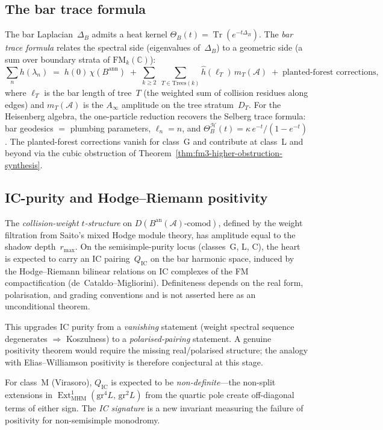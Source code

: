 \documentclass[11pt]{article}
\newcommand{\cA}{\mathcal{A}}
\newcommand{\cH}{\mathcal{H}}
\newcommand{\FM}{\mathrm{FM}}
\newcommand{\Ext}{\operatorname{Ext}}
\newcommand{\Tr}{\operatorname{Tr}}
\providecommand{\bC}{\mathbb{C}}
\begin{document}
\subsection{The bar trace formula}
\label{sec:bar-trace-formula}

The bar Laplacian~$\Delta_B$ admits a heat kernel
$\Theta_B(t) = \Tr(e^{-t\Delta_B})$.
The \emph{bar trace formula} relates the spectral side
(eigenvalues of~$\Delta_B$) to a geometric side (a sum
over boundary strata of $\FM_k(\bC)$):
\[
  \sum_n h(\lambda_n)
  \;=\;
  h(0)\,\chi(B^{\mathrm{ann}})
  \;+\;
  \sum_{k \geq 2}\;
  \sum_{T \in \mathrm{Trees}(k)}
  \hat{h}(\ell_T)\, m_T(\cA)
  \;+\;
  \text{planted-forest corrections},
\]
where $\ell_T$ is the bar length of tree~$T$ (the
weighted sum of collision residues along edges)
and $m_T(\cA)$ is the $A_\infty$ amplitude on the
tree stratum~$D_T$.  For the Heisenberg algebra,
the one-particle reduction recovers the Selberg trace
formula: bar geodesics $=$ plumbing parameters,
$\ell_n = n$, and
$\Theta_B^{\cH}(t) = \kappa\, e^{-t}/(1 - e^{-t})$.
The planted-forest corrections vanish for class~G
and contribute at class~L and beyond via the cubic
obstruction of Theorem~\ref{thm:fm3-higher-obstruction-synthesis}.

\subsection{IC-purity and Hodge--Riemann positivity}
\label{sec:ic-purity-positivity}

The \emph{collision-weight $t$-structure} on
$D(B^{\mathrm{an}}(\cA)\text{-comod})$, defined by the
weight filtration from Saito's mixed Hodge module theory,
has amplitude equal to the shadow depth~$r_{\max}$.  On the
semisimple-purity locus (classes~G, L, C), the heart is expected
to carry an IC pairing~$Q_{\mathrm{IC}}$ on the bar harmonic
space, induced by the Hodge--Riemann bilinear relations on IC
complexes of the FM compactification (de~Cataldo--Migliorini).
Definiteness depends on the real form, polarisation, and grading
conventions and is not asserted here as an unconditional theorem.

This upgrades IC purity from a \emph{vanishing} statement
(weight spectral sequence degenerates $\Rightarrow$
Koszulness) to a \emph{polarised-pairing} statement.  A genuine
positivity theorem would require the missing real/polarised
structure; the analogy with Elias--Williamson positivity is
therefore conjectural at this stage.

For class~M (Virasoro), $Q_{\mathrm{IC}}$ is expected to be
\emph{non-definite}---the non-split extensions in
$\Ext^1_{\mathrm{MHM}}(\mathrm{gr}^4 L,\, \mathrm{gr}^2 L)$
from the quartic pole create off-diagonal terms of either sign.
The \emph{IC signature} is a new invariant measuring the
failure of positivity for non-semisimple monodromy.
\end{document}
